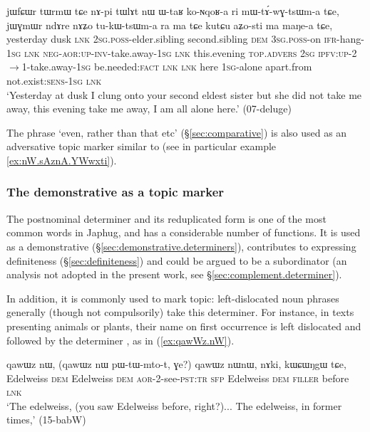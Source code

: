\begin{exe}
\ex \label{ex:jWGmWr.ndAre}
\gll jɯfɕɯr tɯrmɯ tɕe nɤ-pi tɯlɤt nɯ ɯ-taʁ ko-ɴqoʁ-a ri mɯ-tɤ́-wɣ-tsɯm-a tɕe,
jɯɣmɯr ndɤre nɤʑo tu-kɯ-tsɯm-a ra ma tɕe kutɕu aʑo-sti ma maŋe-a tɕe, \\
 yesterday dusk \textsc{lnk} \textsc{2sg}.\textsc{poss}-elder.sibling  second.sibling \textsc{dem} \textsc{3sg}.\textsc{poss}-on \textsc{ifr}-hang-\textsc{1sg} \textsc{lnk} \textsc{neg}-\textsc{aor}:\textsc{up}-\textsc{inv}-take.away-\textsc{1sg} \textsc{lnk} this.evening \textsc{top}.\textsc{advers}  \textsc{2sg} \textsc{ipfv}:\textsc{up}-2$\rightarrow$1-take.away-\textsc{1sg} be.needed:\textsc{fact} \textsc{lnk} \textsc{lnk} here \textsc{1sg}-alone apart.from  not.exist:\textsc{sens}-\textsc{1sg} \textsc{lnk}  \\
\glt  `Yesterday at dusk I clung onto your second eldest sister but she did not take me away, this evening take me away, I am all alone here.' (07-deluge) 
\end{exe}

The phrase  `even, rather than that etc' (§\ref{sec:comparative}) is also used as an adversative topic marker similar to  (see in particular example \ref{ex:nW.sAznA.YWwxti}).

\subsubsection{The demonstrative  as a topic marker} \label{sec:nW.topic}
The postnominal determiner  and its reduplicated form  is one of the most common words in Japhug, and has a considerable number of functions. It is used as a demonstrative (§\ref{sec:demonstrative.determiners}), contributes to expressing definiteness (§\ref{sec:definiteness}) and could be argued to be a subordinator (an analysis not adopted in the present work, see §\ref{sec:complement.determiner}).

In addition, it is commonly used to mark topic: left-dislocated noun phrases generally (though not compulsorily) take this determiner. For instance, in texts presenting animals or plants, their name on first occurrence is left dislocated and followed by the determiner , as in (\ref{ex:qawWz.nW}).

\begin{exe}
\ex \label{ex:qawWz.nW}
\gll  qawɯz nɯ, (qawɯz nɯ pɯ-tɯ-mto-t, ɣe?)  qawɯz nɯnɯ, nɤki, kɯɕɯŋgɯ tɕe, \\
Edelweiss \textsc{dem} Edelweiss \textsc{dem} \textsc{aor}-2-see-\textsc{pst}:\textsc{tr} \textsc{sfp} Edelweiss \textsc{dem} \textsc{filler} before \textsc{lnk} \\
\glt `The edelweiss, (you saw Edelweiss before, right?)... The edelweiss, in former times,' (15-babW) 
\end{exe}

